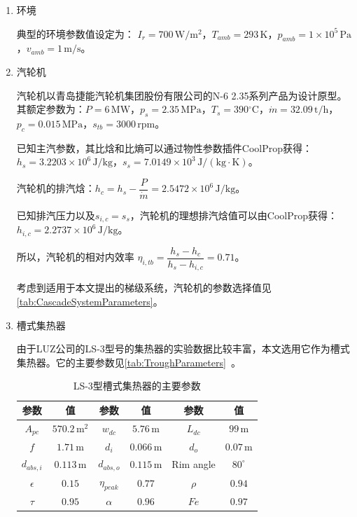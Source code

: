 \begin{enumerate}[label=(\arabic*)]

\item 环境

典型的环境参数值设定为：
$I_r = 700\,\mathrm{W/m^2}$，$T_{amb} = 293\,\mathrm{K}$，$p_{amb} = 1\times10^5\,\mathrm{Pa}$，$v_{amb} = 1\,\mathrm{m/s}$。

\item 汽轮机

汽轮机以青岛捷能汽轮机集团股份有限公司的N-6 2.35系列产品为设计原型。其额定参数为：$P = 6\,\mathrm{MW}$，$p_s = 2.35\,\mathrm{MPa}$，$T_s = 390\mathrm{^\circ C}$，$\dot{m} = 32.09\,\mathrm{t/h}$，$p_c = 0.015\,\mathrm{MPa}$，$s_{tb} = 3000\,\mathrm{rpm}$。
	
	已知主汽参数，其比焓和比熵可以通过物性参数插件CoolProp获得：$h_s = 3.2203\times10^6\,\mathrm{J/kg}$，$s_s = 7.0149\times10^3\,\mathrm{J/(kg\cdot K)}$。
	
	汽轮机的排汽焓：$h_{c} = h_{s} - \dfrac{P}{\dot{m}} = 2.5472\times10^6\,\mathrm{J/kg}$。
	
	已知排汽压力以及$s_{i,c} = s_s$，汽轮机的理想排汽焓值可以由CoolProp获得：$h_{i,c} = 2.2737\times10^6\,\mathrm{J/kg}$。
	
	所以，汽轮机的相对内效率
	$\eta_{i,tb} = \dfrac{h_s - h_c}{h_{s} - h_{i,c}} = 0.71$。
	
	考虑到适用于本文提出的梯级系统，汽轮机的参数选择值见\autoref{tab:CascadeSystemParameters}。
		 
\item 槽式集热器

由于LUZ公司的LS-3型号的集热器的实验数据比较丰富，本文选用它作为槽式集热器。它的主要参数见\autoref{tab:TroughParameters}~\cite{Fernandez2010}。

\begin{table}[htbp]
	\caption{LS-3型槽式集热器的主要参数}
	\centering
	\begin{tabular}{cccccc}
		\toprule
		参数		&	值	&	参数		&	值	&	参数		&	值\\
		\midrule
		$A_{pc}$		&	$570.2\,\mathrm{m^2}$	&	$w_{dc}$	&	$5.76\,\mathrm{m}$	&	$L_{dc}$	&	$99\,\mathrm{m}$\\
		$f$	&	$1.71\,\mathrm{m}$	&	$d_i$		&	$0.066\,\mathrm{m}$	&	$d_o$	&	$0.07\,\mathrm{m}$\\
		$d_{abs,i}$	&	$0.113\,\mathrm{m}$	&	$d_{abs,o}$	&	$0.115\,\mathrm{m}$	&	Rim angle	&	$80^\circ$\\
		$\epsilon$		&	$0.15$	&	$\eta_{peak}$	&	$0.77$	&	$\rho$	&	$0.94$\\
		$\tau$	&	$0.95$	&	
$\alpha$	&	$0.96$	&	$Fe$	&	$0.97$\\
		\bottomrule
	\end{tabular}
	\label{tab:TroughParameters}
\end{table}


\end{enumerate}
